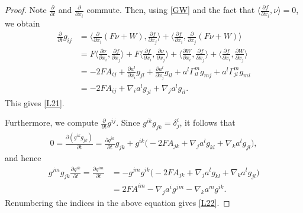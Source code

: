 \documentclass[10pt,a4paper]{amsart}
\begin{document}
\begin{proof}


Note $\frac{\partial}{\partial t}$ and
$\frac{\partial}{\partial x_i}$  commute. Then,  using \eqref{GW}  and  the fact that $\langle
\frac{\partial f}{\partial x_i}, \nu \rangle =0 $, we obtain
\begin{align}
\frac{\partial}{\partial t}g_{ij}
&=\langle \frac{\partial }{\partial x_i}(F\nu+W),
\frac{\partial f}{\partial x_j}\rangle+\langle \frac{\partial f
}{\partial x_i},
\frac{\partial }{\partial x_j}(F\nu+W)\rangle\nonumber\\
&= F\langle \frac{\partial \nu }{\partial x_i},
\frac{\partial f}{\partial x_j}\rangle + F \langle  \frac{\partial f }{\partial x_i},
\frac{\partial \nu}{\partial x_j}\rangle +\langle \frac{\partial W}{\partial x_i},
\frac{\partial f}{\partial x_j}\rangle+\langle \frac{\partial
f}{\partial x_i}, \frac{\partial W}{\partial x_j}\rangle\nonumber\\
&=-2F A_{ij}+\frac{\partial a^l}{\partial
x_i}g_{jl}+\frac{\partial a^l}{\partial
x_j}g_{il}+a^l\Gamma_{il}^mg_{mj}+a^l\Gamma_{jl}^mg_{mi}\nonumber\\
&=-2F A_{ij}+\nabla_i a^l g_{jl}+\nabla_j a^lg_{il}.\nonumber
\end{align}
This gives \eqref{L21}.

Furthermore, we compute $\frac{\partial}{\partial t}g^{ij}$. Since
$g^{ik}g_{jk}=\delta^i_j$, it follows that
\begin{align}
0=\frac{\partial (g^{ik}g_{jk})}{\partial t}=\frac{\partial
g^{ik}}{\partial t}g_{jk}+g^{ik}\big(-2F A_{jk}+\nabla_j a^l
g_{kl}+\nabla_k a^lg_{jl} \big),\nonumber
\end{align}
and hence
\begin{align}
g^{jm}g_{jk}\frac{\partial g^{ik}}{\partial t}=\frac{\partial
g^{im}}{\partial t}&=-g^{jm}g^{ik}\big(-2F A_{jk}+\nabla_j a^l
g_{kl}+\nabla_k a^lg_{jl} \big)\nonumber\\
&=2F A^{im}-\nabla_j a^i g^{jm}-\nabla_k a^m g^{ik}. \nonumber
\end{align}
Renumbering the indices in the above equation gives \eqref{L22}.


\end{proof}
\end{document}
